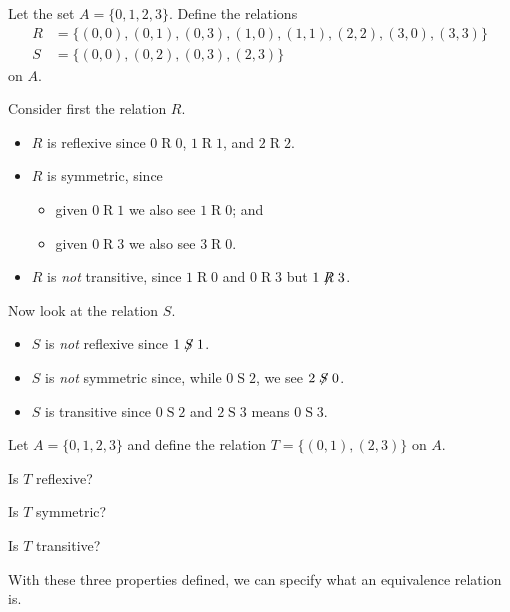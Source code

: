 \begin{example}
    Let the set $A = \{0,1,2,3\}$. Define the relations
    \begin{align*}
        R &= \{(0,0),(0,1),(0,3),(1,0),(1,1),(2,2),(3,0),(3,3)\}\\
        S &= \{(0,0),(0,2),(0,3),(2,3)\}
    \end{align*}
    on $A$.

    Consider first the relation $R$.
    \begin{itemize}
        \item $R$ is reflexive since $0\mathrel{R}0$, $1\mathrel{R}1$, and $2\mathrel{R}2$.
        \item $R$ is symmetric, since
        \begin{itemize}
            \item given $0\mathrel{R}1$ we also see $1\mathrel{R}0$; and
            \item given $0\mathrel{R}3$ we also see $3\mathrel{R}0$.
        \end{itemize}
        \item $R$ is \textit{not} transitive, since $1\mathrel{R}0$ and $0\mathrel{R}3$ but $1\not\mathrel{R}3$.
    \end{itemize}

    Now look at the relation $S$.
    \begin{itemize}
        \item $S$ is \textit{not} reflexive since $1\not\mathrel{S}1$.
        \item $S$ is \textit{not} symmetric since, while $0\mathrel{S}2$, we see $2\not\mathrel{S}0$.
        \item $S$ is transitive since $0\mathrel{S}2$ and $2\mathrel{S}3$ means $0\mathrel{S}3$.
    \end{itemize}
\end{example}

\begin{exercise}
    Let $A = \{0, 1, 2, 3\}$ and define the relation $T = \{(0, 1), (2, 3)\}$ on $A$.
    \begin{partquestions}{\alph*}
        \item Is $T$ reflexive?
        \item Is $T$ symmetric?
        \item Is $T$ transitive?
    \end{partquestions}
\end{exercise}

With these three properties defined, we can specify what an equivalence relation is.

